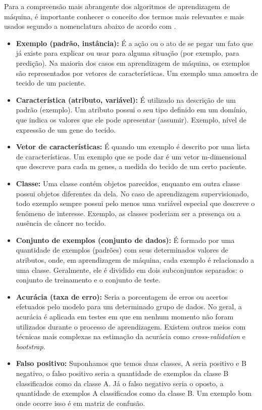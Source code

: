 \par
Para a compreensão mais abrangente dos algoritmos de aprendizagem de máquina, é importante conhecer o conceito dos termos mais relevantes e mais usados segundo a nomenclatura abaixo de acordo com \cite{Monard2003, Souto2003, Henke2011}.

\begin{itemize}
    \item \textbf{Exemplo (padrão, instância):} É a ação ou o ato de se pegar um fato que já existe para explicar ou usar para alguma situação (por exemplo, para predição). Na maioria dos casos em aprendizagem de máquina, os exemplos são representados por vetores de características. Um exemplo uma amostra de tecido de um paciente.
    \item \textbf{Característica (atributo, variável):} É utilizado na descrição de um padrão (exemplo). Um atributo possui o seu tipo definido em um domínio, que indica os valores que ele pode apresentar (assumir). Exemplo, nível de expressão de um gene do tecido.
    \item \textbf{Vetor de características:} É quando um exemplo é descrito por uma lista de características. Um exemplo que se pode dar é um vetor m-dimensional que descreve para cada m genes, a medida do tecido de um certo paciente.
    \item \textbf{Classe:} Uma classe contém objetos parecidos, enquanto em outra classe possui objetos diferentes da dela. No caso de aprendizagem supervisionado, todo exemplo sempre possui pelo menos uma variável especial que descreve o fenômeno de interesse. Exemplo, as classes poderiam ser a presença ou a ausência de câncer no tecido.
    \item \textbf{Conjunto de exemplos (conjunto de dados):} É formado por uma quantidade de exemplos (padrões) com seus determinados valores de atributos, onde, em aprendizagem de máquina, cada exemplo é relacionado a uma classe. Geralmente, ele é dividido em dois subconjuntos separados: o conjunto de treinamento e o conjunto de teste.
    \item \textbf{Acurácia (taxa de erro):} Seria a porcentagem de erros ou acertos efetuados pelo modelo para um determinado grupo de dados. No geral, a acurácia é aplicada em testes em que em nenhum momento não foram utilizados durante o processo de aprendizagem. Existem outros meios com técnicas mais complexas na estimação da acurácia como \textit{cross-validation} e \textit{bootstrap}. 
    \item \textbf{Falso positivo:} Suponhamos que temos duas classes, A seria positivo e B negativo, o falso positivo seria a quantidade de exemplos da classe B classificados como da classe A. Já o falso negativo seria o oposto, a quantidade de exemplos A classificados como da classe B. Um exemplo bom onde ocorre isso é em matriz de confusão. 

\end{itemize}
